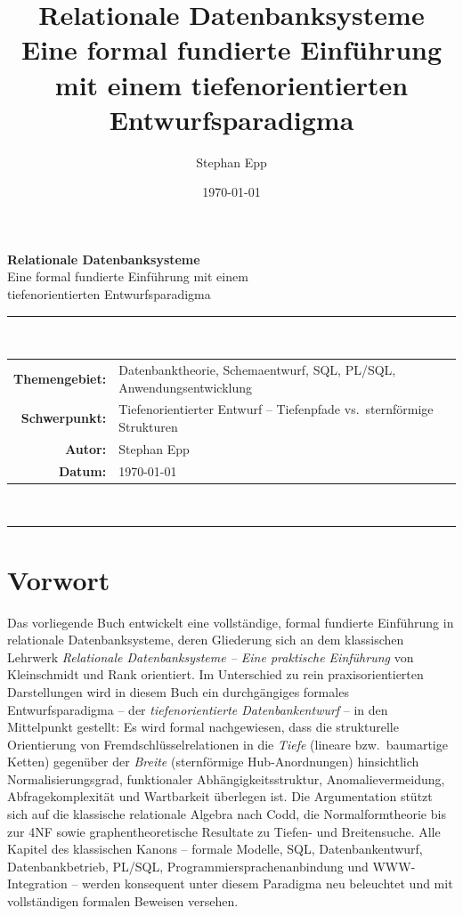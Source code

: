 ﻿\documentclass[a4paper,12pt]{report}
\title{Relationale Datenbanksysteme \\ \large Eine formal fundierte Einführung mit
einem tiefenorientierten Entwurfsparadigma}
\author{Stephan Epp}
\date{\today}
\theoremstyle{definition}
\theoremstyle{remark}
\begin{document}
\begin{titlepage}
  \centering
  \vspace*{2cm}
  {\LARGE\bfseries Relationale Datenbanksysteme}\\[0.5em]
  {\Large Eine formal fundierte Einführung mit einem\\
  tiefenorientierten Entwurfsparadigma}
  \vspace{1.5cm}

  \rule{\textwidth}{0.4pt}\\[0.5em]
  \begin{tabular}{@{}r p{11cm}@{}}
    \textbf{Themengebiet:} & Datenbanktheorie, Schemaentwurf, SQL, PL/SQL, Anwendungsentwicklung \\[2pt]
    \textbf{Schwerpunkt:}  & Tiefenorientierter Entwurf -- Tiefenpfade vs.\ sternförmige Strukturen \\[2pt]
    \textbf{Autor:}        & Stephan Epp \\[2pt]
    \textbf{Datum:}        & \today \\
  \end{tabular}\\[0.5em]
  \rule{\textwidth}{0.4pt}
  \vfill
\end{titlepage}

\tableofcontents

\chapter*{Vorwort}

Das vorliegende Buch entwickelt eine vollständige, formal fundierte
Einführung in relationale Datenbanksysteme, deren Gliederung sich an dem
klassischen Lehrwerk \emph{Relationale Datenbanksysteme -- Eine praktische
Einführung} von Kleinschmidt und Rank orientiert. Im Unterschied zu rein
praxisorientierten Darstellungen wird in diesem Buch ein durchgängiges
formales Entwurfsparadigma -- der \emph{tiefenorientierte Datenbankentwurf}
-- in den Mittelpunkt gestellt: Es wird formal nachgewiesen, dass die
strukturelle Orientierung von Fremdschlüsselrelationen in die \emph{Tiefe}
(lineare bzw.\ baumartige Ketten) gegenüber der \emph{Breite}
(sternförmige Hub-Anordnungen) hinsichtlich Normalisierungsgrad,
funktionaler Abhängigkeitsstruktur, Anomalievermeidung,
Abfragekomplexität und Wartbarkeit überlegen ist. Die Argumentation
stützt sich auf die klassische relationale Algebra nach Codd, die
Normalformtheorie bis zur 4NF sowie graphentheoretische Resultate zu
Tiefen- und Breitensuche. Alle Kapitel des klassischen Kanons --
formale Modelle, SQL, Datenbankentwurf, Datenbankbetrieb, PL/SQL,
Programmiersprachenanbindung und WWW-Integration -- werden konsequent
unter diesem Paradigma neu beleuchtet und mit vollständigen formalen
Beweisen versehen.
\end{document}
